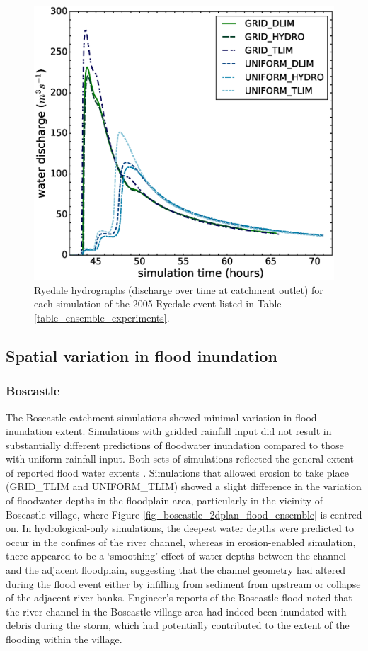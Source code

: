 \begin{figure}[t]
\includegraphics[width=14cm]{chp06_figures_scripts/figure_ryedale_hydrograph_ensemble.eps}
\caption{Ryedale hydrographs (discharge over time at catchment outlet) for each simulation of the 2005 Ryedale event listed in Table \ref{table_ensemble_experiments}.}
\label{fig_ryedale_hydrograph_ensemble}
\end{figure}



\subsection{Spatial variation in flood inundation}
\subsubsection{Boscastle}
The Boscastle catchment simulations showed minimal variation in flood inundation extent. Simulations with gridded rainfall input did not result in substantially different predictions of floodwater inundation compared to those with uniform rainfall input. Both sets of simulations reflected the general extent of reported flood water extents \citep{wallingford2005flooding}. Simulations that allowed erosion to take place (GRID\_TLIM and UNIFORM\_TLIM) showed a slight difference in the variation of floodwater depths in the floodplain area, particularly in the vicinity of Boscastle village, where Figure \ref{fig_boscastle_2dplan_flood_ensemble} is centred on. In hydrological-only simulations, the deepest water depths were predicted to occur in the confines of the river channel, whereas in erosion-enabled simulation, there appeared to be a `smoothing' effect of water depths between the channel and the adjacent floodplain, suggesting that the channel geometry had altered during the flood event either by infilling from sediment from upstream or collapse of the adjacent river banks. Engineer's reports of the Boscastle flood noted that the river channel in the Boscastle village area had indeed been inundated with debris during the storm, which had potentially contributed to the extent of the flooding within the village.

